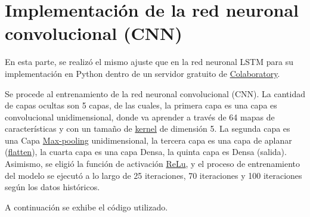 \documentclass[
  us-letterpaper,
]{scrreprt}
\theoremstyle{plain}
\theoremstyle{definition}
\theoremstyle{definition}
\theoremstyle{remark}
\begin{document}
\section{Implementación de la red neuronal convolucional
(CNN)}\label{sec-implementaciuxf3n-de-la-red-neuronal-cnn.}

En esta parte, se realizó el mismo ajuste que en la red neuronal LSTM
para su implementación en Python dentro de un servidor gratuito de
\hyperref[sec-colab]{Colaboratory}.

Se procede al entrenamiento de la red neuronal convolucional (CNN). La
cantidad de capas ocultas son 5 capas, de las cuales, la primera capa es
una capa es convolucional unidimensional, donde va aprender a través de
64 mapas de características y con un tamaño de
\hyperref[sec-kernel]{kernel} de dimensión 5. La segunda capa es una
Capa \hyperref[sec-pooling]{Max-pooling} unidimensional, la tercera capa
es una capa de aplanar (\hyperref[sec-fratten]{flatten}), la cuarta capa
es una capa Densa, la quinta capa es Densa (salida). Asimismo, se eligió
la función de activación \hyperref[sec-Relu]{ReLu}, y el proceso de
entrenamiento del modelo se ejecutó a lo largo de 25 iteraciones, 70
iteraciones y 100 iteraciones según los datos históricos.

A continuación se exhibe el código utilizado.
\end{document}
